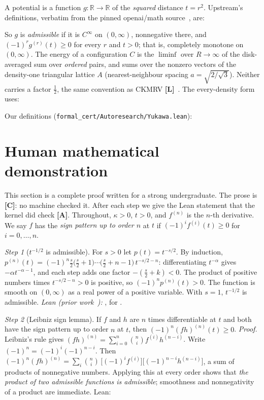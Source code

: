 \documentclass[11pt]{article}
\theoremstyle{remark}
\newtheorem{step}{Step}
\newcommand{\R}{\mathbb{R}}
\newcommand{\tier}[1]{\textbf{[#1]}}
\begin{document}
A potential is a function $g:\R\to\R$ of the \emph{squared} distance $t=r^2$. Upstream's definitions, verbatim from
the pinned openai/math source~\cite{oai}, are:

\noindent So $g$ is \emph{admissible} if it is $C^\infty$ on $(0,\infty)$, nonnegative there, and
$(-1)^r g^{(r)}(t)\ge 0$ for every $r$ and $t>0$; that is, completely monotone on $(0,\infty)$. The energy of a
configuration $C$ is the $\liminf$ over $R\to\infty$ of the disk-averaged sum over \emph{ordered} pairs, and
 sums over the nonzero vectors of the density-one triangular lattice $A$ (nearest-neighbour
spacing $a=\sqrt{2/\sqrt3}$). Neither carries a factor $\tfrac12$, the same convention as CKMRV \tier{L}~\cite{ckmrv}.
The every-density form~\cite{d12} uses:

\noindent Our definitions (\texttt{formal\_cert/Autoresearch/Yukawa.lean}):


\section{Human mathematical demonstration}\label{sec:human}

This section is a complete proof written for a strong undergraduate. The prose is \tier{C}: no machine checked it.
After each step we give the Lean statement that the kernel did check \tier{A}. Throughout, $\kappa>0$, $t>0$, and
$f^{(n)}$ is the $n$-th derivative. We say $f$ has the \emph{sign pattern up to order $n$} at $t$ if
$(-1)^i f^{(i)}(t)\ge0$ for $i=0,\dots,n$.

\begin{step}[$t^{-1/2}$ is admissible]
For $s>0$ let $p(t)=t^{-s/2}$. By induction,
$p^{(n)}(t)=(-1)^n \tfrac{s}{2}\big(\tfrac{s}{2}+1\big)\cdots\big(\tfrac{s}{2}+n-1\big)\,t^{-s/2-n}$: differentiating
$t^{-\alpha}$ gives $-\alpha t^{-\alpha-1}$, and each step adds one factor $-(\tfrac s2+k)<0$. The product of
positive numbers times $t^{-s/2-n}>0$ is positive, so $(-1)^np^{(n)}(t)>0$. The function is smooth on $(0,\infty)$ as
a real power of a positive variable. With $s=1$, $t^{-1/2}$ is admissible.
\emph{Lean (prior work~\cite{d12}):} , for .
\end{step}

\begin{step}[Leibniz sign lemma]
If $f$ and $h$ are $n$ times differentiable at $t$ and both have the sign pattern up to order $n$ at $t$, then
$(-1)^n(fh)^{(n)}(t)\ge0$. \emph{Proof.} Leibniz's rule gives
$(fh)^{(n)}=\sum_{i=0}^n\binom ni f^{(i)}h^{(n-i)}$. Write $(-1)^n=(-1)^i(-1)^{n-i}$. Then
$(-1)^n(fh)^{(n)}=\sum_i\binom ni\,\big[(-1)^if^{(i)}\big]\big[(-1)^{n-i}h^{(n-i)}\big]$, a sum of products of
nonnegative numbers. Applying this at every order shows that \emph{the product of two admissible functions is
admissible}; smoothness and nonnegativity of a product are immediate. Lean:
\end{step}

\end{document}
